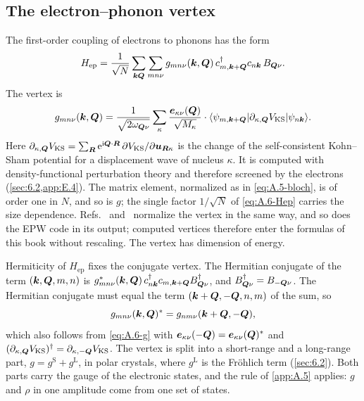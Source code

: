 \subsection{The electron--phonon vertex}

The first-order coupling of electrons to phonons has the form
\begin{equation}
  H_{\mathrm{ep}} = \frac{1}{\sqrt N}\sum_{\bm{k}\bm{Q}}\sum_{mn\nu} g_{mn\nu}(\bm{k},\bm{Q})\,c^\dagger_{m,\bm{k}+\bm{Q}}c_{n\bm{k}}\,B_{\bm{Q}\nu}.
  \label{eq:A.6-Hep}
\end{equation}
The vertex is
\begin{equation}
  g_{mn\nu}(\bm{k},\bm{Q}) = \frac{1}{\sqrt{2\omega_{\bm{Q}\nu}}}\sum_\kappa \frac{\bm{e}_{\kappa\nu}(\bm{Q})}{\sqrt{M_\kappa}}\cdot\langle\psi_{m,\bm{k}+\bm{Q}}|\partial_{\kappa,\bm{Q}}V_{\mathrm{KS}}|\psi_{n\bm{k}}\rangle.
  \label{eq:A.6-g}
\end{equation}
Here $\partial_{\kappa,\bm{Q}}V_{\mathrm{KS}} = \sum_{\bm{R}}\mathrm{e}^{\mathrm{i}\bm{Q}\cdot\bm{R}}\,\partial V_{\mathrm{KS}}/\partial\bm{u}_{\bm{R}\kappa}$ is the change of the self-consistent Kohn--Sham potential for a displacement wave of nucleus $\kappa$. It is computed with density-functional perturbation theory and therefore screened by the electrons (\cref{sec:6.2,app:E.4}). The matrix element, normalized as in \cref{eq:A.5-bloch}, is of order one in $N$, and so is $g$; the single factor $1/\sqrt N$ of \cref{eq:A.6-Hep} carries the size dependence. Refs.~\cite[Eqs.~(37) and (38)]{giustino2017electron} and~\cite[Eq.~(2)]{ponce2016epw} normalize the vertex in the same way, and so does the EPW code in its output; computed vertices therefore enter the formulas of this book without rescaling. The vertex has dimension of energy.

Hermiticity of $H_{\mathrm{ep}}$ fixes the conjugate vertex. The Hermitian conjugate of the term $(\bm{k},\bm{Q},m,n)$ is $g^*_{mn\nu}(\bm{k},\bm{Q})\,c^\dagger_{n\bm{k}}c_{m,\bm{k}+\bm{Q}}B^\dagger_{\bm{Q}\nu}$, and $B^\dagger_{\bm{Q}\nu} = B_{-\bm{Q}\nu}$. The Hermitian conjugate must equal the term $(\bm{k}+\bm{Q}, -\bm{Q}, n, m)$ of the sum, so
\begin{equation}
  g_{mn\nu}(\bm{k},\bm{Q})^* = g_{nm\nu}(\bm{k}+\bm{Q},-\bm{Q}),
  \label{eq:A.6-herm}
\end{equation}
which also follows from \cref{eq:A.6-g} with $\bm{e}_{\kappa\nu}(-\bm{Q}) = \bm{e}_{\kappa\nu}(\bm{Q})^*$ and $(\partial_{\kappa,\bm{Q}}V_{\mathrm{KS}})^\dagger = \partial_{\kappa,-\bm{Q}}V_{\mathrm{KS}}$. The vertex is split into a short-range and a long-range part, $g = g^{\mathrm{S}} + g^{\mathrm{L}}$, in polar crystals, where $g^{\mathrm{L}}$ is the Fr\"ohlich term (\cref{sec:6.2}). Both parts carry the gauge of the electronic states, and the rule of \cref{app:A.5} applies: $g$ and $\rho$ in one amplitude come from one set of states.

